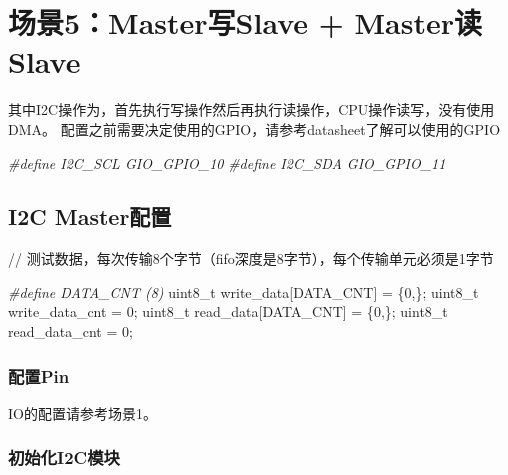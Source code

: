 \documentclass[
  12pt,
]{book}
\newenvironment{Shaded}{\begin{snugshade}}{\end{snugshade}}
\newcommand{\DataTypeTok}[1]{\textcolor[rgb]{0.13,0.29,0.53}{#1}}
\newcommand{\DecValTok}[1]{\textcolor[rgb]{0.00,0.00,0.81}{#1}}
\newcommand{\NormalTok}[1]{#1}
\newcommand{\PreprocessorTok}[1]{\textcolor[rgb]{0.56,0.35,0.01}{\textit{#1}}}
\begin{document}
\hypertarget{ux573aux666f5masterux5199slave-masterux8bfbslave}{%
\section{场景5：Master写Slave + Master读Slave}\label{ux573aux666f5masterux5199slave-masterux8bfbslave}}

其中I2C操作为，首先执行写操作然后再执行读操作，CPU操作读写，没有使用DMA。 配置之前需要决定使用的GPIO，请参考datasheet了解可以使用的GPIO

\begin{Shaded}
\begin{Highlighting}[]
\PreprocessorTok{#define I2C_SCL         GIO_GPIO_10}
\PreprocessorTok{#define I2C_SDA         GIO_GPIO_11}
\end{Highlighting}
\end{Shaded}

\hypertarget{i2c-masterux914dux7f6e-4}{%
\subsection{I2C Master配置}\label{i2c-masterux914dux7f6e-4}}

// 测试数据，每次传输8个字节（fifo深度是8字节），每个传输单元必须是1字节

\begin{Shaded}
\begin{Highlighting}[]
\PreprocessorTok{#define DATA_CNT (8)}
\DataTypeTok{uint8_t}\NormalTok{ write_data[DATA_CNT] = \{}\DecValTok{0}\NormalTok{,\};}
\DataTypeTok{uint8_t}\NormalTok{ write_data_cnt = }\DecValTok{0}\NormalTok{;}
\DataTypeTok{uint8_t}\NormalTok{ read_data[DATA_CNT] = \{}\DecValTok{0}\NormalTok{,\};}
\DataTypeTok{uint8_t}\NormalTok{ read_data_cnt = }\DecValTok{0}\NormalTok{;}
\end{Highlighting}
\end{Shaded}

\hypertarget{ux914dux7f6epin-8}{%
\subsubsection{配置Pin}\label{ux914dux7f6epin-8}}

IO的配置请参考场景1。

\hypertarget{ux521dux59cbux5316i2cux6a21ux5757-8}{%
\subsubsection{初始化I2C模块}\label{ux521dux59cbux5316i2cux6a21ux5757-8}}
\end{document}
